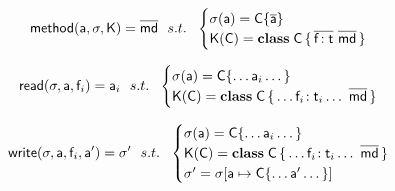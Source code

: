 \documentclass[a4paper,UKenglish,final]{tex/lipics-v2016}
\begin{document}
\hrulefill


\begin{equation*}
{\sf{method}}({\sf{a}},\sigma,{\sf{K}}) = \overline{{\sf{md}}} ~~s.t.~~ \begin{cases}

 \sigma({\sf{a}}) =  {\sf{C}}\{\overline{{\sf{a}}}\} \\
 {\sf{K}}({\sf{C}}) = {\sf{\bf class}}\;{\sf{C}}\,\{\,\overline{ {{\sf{f}}}\!:{{\sf{t}}} }~\overline{{\sf{md}}}\,\}\\
\end{cases}
\end{equation*}


% 
% 
% 

\hrulefill


\begin{equation*}
\readf \s\a{\f_{i}} = \a_{i} ~~s.t.~~ \begin{cases}

 \s(\a) = \obj\C{\dots \a_{i} \dots}\\
 \K(\C) = \Class \C {\dots \Ftype{\f_{i}}{\t_{i}} \dots}{\b\md}\\
\end{cases}
\end{equation*}

\hrulefill


\begin{equation*}
\setf \s\a{\f_{i}}\ap = \sp ~~s.t.~~ \begin{cases}

 \s(\a) = \obj\C{\dots \a_{i} \dots}\\
 \K(\C) = \Class \C {\dots \Ftype{\f_{i}}{\t_{i}} \dots}{\b\md}\\
 \sp = \s[\Bind{\a}{\obj\C{\dots \ap \dots}}]
\end{cases}
\end{equation*}

\hrulefill

\end{document}
